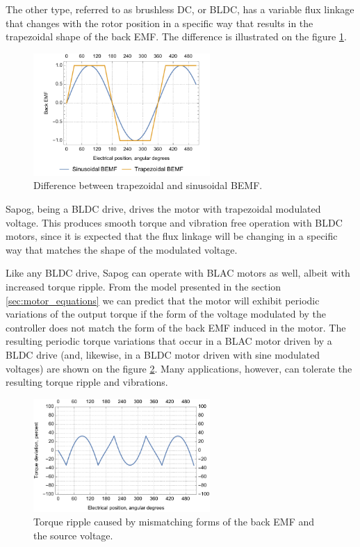\documentclass{zubaxdoc}
\begin{document}
The other type, referred to as brushless DC, or BLDC, has a variable flux linkage that changes with the
rotor position in a specific way that results in the trapezoidal shape of the back EMF.
The difference is illustrated on the figure \ref{bemf_trapezoidal_vs_sinusoidal}.

\begin{figure}[hbt]
    \centering
	\includegraphics[width=0.6\textwidth]{bemf_trapezoidal_vs_sinusoidal}
	\caption{Difference between trapezoidal and sinusoidal BEMF.
	\label{bemf_trapezoidal_vs_sinusoidal}}
\end{figure}

Sapog, being a BLDC drive, drives the motor with trapezoidal modulated voltage.
This produces smooth torque and vibration free operation with BLDC motors,
since it is expected that the flux linkage will be changing in a specific way
that matches the shape of the modulated voltage.

Like any BLDC drive, Sapog can operate with BLAC motors as well, albeit with increased torque ripple.
From the model presented in the section \ref{sec:motor_equations} we can predict that the motor
will exhibit periodic variations of the output torque if the form of the voltage modulated by the controller
does not match the form of the back EMF induced in the motor.
The resulting periodic torque variations that occur in a BLAC motor driven by a BLDC drive
(and, likewise, in a BLDC motor driven with sine modulated voltages) are shown on the figure 
\ref{sine_torque_deviation}.
Many applications, however, can tolerate the resulting torque ripple and vibrations.

\begin{figure}[hbt]
    \centering
	\includegraphics[width=0.6\textwidth]{sine_torque_deviation}
	\caption{Torque ripple caused by mismatching forms of the back EMF and the source voltage.
	\label{sine_torque_deviation}}
\end{figure}
\end{document}
